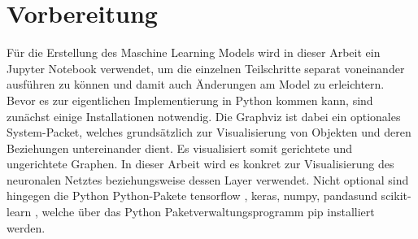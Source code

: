 \documentclass[thesis=paper,fancy]{hsmw-thesis}
\begin{document}
\section{Vorbereitung}
Für die Erstellung des Maschine Learning Models wird in dieser Arbeit ein Jupyter Notebook verwendet, um die einzelnen Teilschritte separat voneinander ausführen zu können und damit auch Änderungen am Model zu erleichtern. Bevor es zur eigentlichen Implementierung in Python kommen kann, sind zunächst einige Installationen notwendig. Die \glqq Graphviz\grqq{} ist dabei ein optionales System-Packet, welches grundsätzlich zur Visualisierung von Objekten und deren Beziehungen untereinander dient. Es visualisiert somit gerichtete und ungerichtete Graphen. In dieser Arbeit wird es konkret zur Visualisierung des neuronalen Netztes beziehungsweise dessen Layer verwendet. Nicht optional sind hingegen die Python Python-Pakete \glqq tensorflow \grqq, \glqq keras\grqq, \glqq numpy\grqq, \glqq pandas\grqq und \glqq{} scikit-learn\grqq{} , welche über das Python Paketverwaltungsprogramm pip installiert werden.
\end{document}
